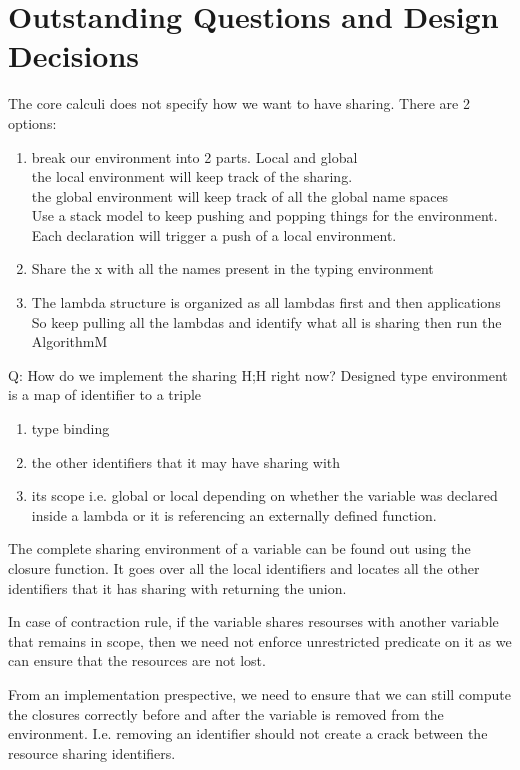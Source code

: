 \chapter{Outstanding Questions and Design Decisions}

The core calculi does not specify how we want to have sharing.
There are 2 options:
\begin{enumerate}
\item break our environment into 2 parts. Local and global
  \\the local environment will keep track of the sharing.
  \\the global environment will keep track of all the global name spaces
  \\Use a stack model to keep pushing and popping things for the environment.
  \\Each declaration will trigger a push of a local environment.
\item Share the x with all the names present in the typing environment
\item The lambda structure is organized as all lambdas first and then applications
  So keep pulling all the lambdas and identify what all is sharing then run the AlgorithmM
\end{enumerate}

Q: How do we implement the sharing H;H right now?
Designed type environment is a map of identifier to a triple
\begin{enumerate}
\item type binding
\item the other identifiers that it may have sharing with
\item its scope i.e. global or local depending on whether the variable was declared inside a lambda or it is referencing an externally defined function.
\end{enumerate}

The complete sharing environment of a variable can be found out using the
closure function. It goes over all the local identifiers and locates all
the other identifiers that it has sharing with returning the union.

In case of contraction rule, if the variable shares resourses
with another variable that remains in scope, then we need not enforce
unrestricted predicate on it as we can ensure that the resources are
not lost.

From an implementation prespective, we need to ensure that we can still compute
the closures correctly before and after the variable is removed
from the environment. I.e. removing an identifier should not create a
crack between the resource sharing identifiers.

